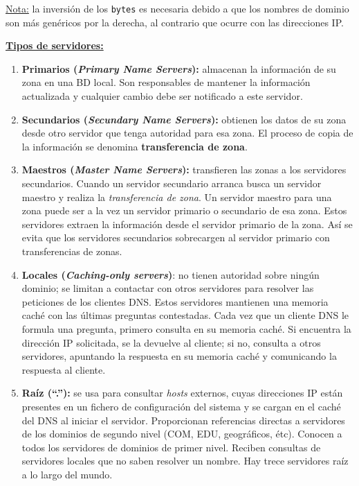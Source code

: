 \documentclass[10pt,a4paper]{article}
\begin{document}
\underline{Nota:} la inversión de los \texttt{bytes} es necesaria debido a que los nombres de dominio son más genéricos por la derecha, al contrario que ocurre con las direcciones IP.

\underline{\textbf{Tipos de servidores:}}

\begin{enumerate}
\item \textbf{Primarios (\textit{Primary Name Servers}):} almacenan la información de su zona en una BD local. Son responsables de mantener la información actualizada y cualquier cambio debe ser notificado a este servidor.
\item \textbf{Secundarios (\textit{Secundary Name Servers}):} obtienen los datos de su zona desde otro servidor que tenga autoridad para esa zona. El proceso de copia de la información se denomina \textbf{transferencia de zona}.
\item \textbf{Maestros (\textit{Master Name Servers}):} transfieren las zonas a los servidores secundarios. Cuando un servidor secundario arranca busca un servidor maestro y realiza la \textit{transferencia de zona}. Un servidor maestro para una zona puede ser a la vez un servidor primario o secundario de esa zona. Estos servidores extraen la información desde el servidor primario de la zona. Así se evita que los servidores secundarios sobrecargen al servidor primario con transferencias de zonas.
\item \textbf{Locales (\textit{Caching-only servers})}: no tienen autoridad sobre ningún dominio; se limitan a contactar con otros servidores para resolver las peticiones de los clientes DNS. Estos servidores mantienen una memoria caché con las últimas preguntas contestadas. Cada vez que un cliente DNS le formula una pregunta, primero consulta en su memoria caché. Si encuentra la dirección IP solicitada, se la devuelve al cliente; si no, consulta a otros servidores, apuntando la respuesta en su memoria caché y comunicando la respuesta al cliente.
\item \textbf{Raíz (``.''):} se usa para consultar \textit{hosts} externos, cuyas direcciones IP están presentes en un fichero de configuración del sistema y se cargan en el caché del DNS al iniciar el servidor. Proporcionan referencias directas a
servidores de los dominios de segundo nivel (COM, EDU, geográficos, étc). Conocen a todos los servidores de dominios de primer nivel. Reciben consultas de servidores locales que no saben resolver un nombre. Hay trece servidores raíz a lo largo del mundo.
\end{enumerate}
\end{document}
